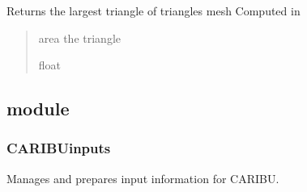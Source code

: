 \documentclass[letterpaper,10pt,english]{sphinxmanual}
\begin{document}
\begin{fulllineitems}
\begin{fulllineitems}
\label{\detokenize{reference:LVM.LightVegeManager.leafangledistribution}}
\pysigstartsignatures
{}
\pysigstopsignatures
\end{fulllineitems}


\begin{fulllineitems}
\label{\detokenize{reference:LVM.LightVegeManager.domain}}
\pysigstartsignatures
{}
\pysigstopsignatures
\sphinxAtStartPar
Returns the largest triangle of triangles mesh
Computed in {\hyperref[\detokenize{reference:LVM.LightVegeManager.build}]{}}
\begin{quote}\begin{description}
\sphinxAtStartPar
area the triangle

\sphinxAtStartPar
float

\end{description}\end{quote}

\end{fulllineitems}


\end{fulllineitems}



\subsection{ module}
\label{\detokenize{reference:module-CARIBUinputs}}\label{\detokenize{reference:caribuinputs-module}}

\subsubsection{CARIBUinputs}
\label{\detokenize{reference:caribuinputs}}
\sphinxAtStartPar
Manages and prepares input information for CARIBU.
\end{document}
